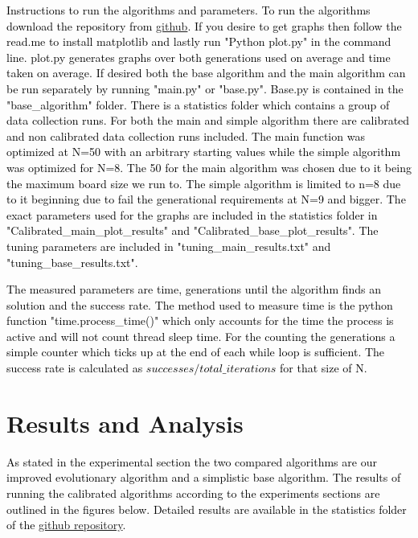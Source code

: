 \documentclass{scrartcl}
\begin{document}
\textcolor{black}{Instructions to run the algorithms and parameters. To run the algorithms download the repository from \href{https://github.com/Sneakycloud/N-queens\_problem\_Evolutionary\_Alg/tree/main}{github}. If you desire to get graphs then follow the read.me to install matplotlib and lastly run "Python plot.py" in the command line. plot.py generates graphs over both generations used on average and time taken on average. If desired both the base algorithm and the main algorithm can be run separately by running "main.py" or "base.py". Base.py is contained in the "base\_algorithm" folder. There is a statistics folder which contains a group of data collection runs. For both the main and simple algorithm there are calibrated and non calibrated data collection runs included. The main function was optimized at N=50 with an arbitrary starting values while the simple algorithm was optimized for N=8. The 50 for the main algorithm was chosen due to it being the maximum board size we run to. The simple algorithm is limited to n=8 due to it beginning due to fail the generational requirements at N=9 and bigger.  The exact parameters used for the graphs are included in the statistics folder in "Calibrated\_main\_plot\_results" and "Calibrated\_base\_plot\_results". The tuning parameters are included in "tuning\_main\_results.txt" and "tuning\_base\_results.txt".}

\textcolor{black}{The measured parameters are time, generations until the algorithm finds an solution and the success rate. The method used to measure time is the python function "time.process\_time()" which only accounts for the time the process is active and will not count thread sleep time. For the counting the generations a simple counter which ticks up at the end of each while loop is sufficient. The success rate is calculated as \(successes / total\_iterations\) for that size of N.}

\section{Results and Analysis}
\label{sec:results-analysis}
\textcolor{black}{As stated in the experimental section the two compared algorithms are our improved evolutionary algorithm and a simplistic base algorithm.  The results of running the calibrated algorithms according to the experiments sections are outlined in the figures below. Detailed results are available in the statistics folder of the  \href{https://github.com/Sneakycloud/N-queens\_problem\_Evolutionary\_Alg/tree/main}{github repository}. }
\end{document}
